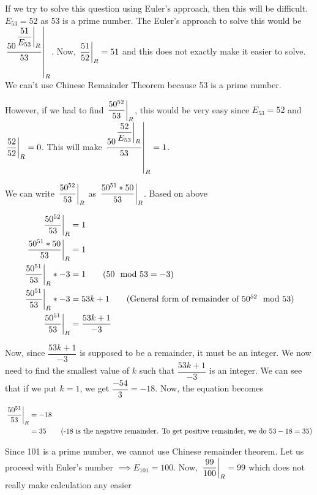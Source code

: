 
If we try to solve this question using Euler's approach, then this will be difficult. $E_{53} = 52 $ as 53 is a prime number. The Euler's approach to solve this would be $\displaystyle{ \left. \frac{50^{ \displaystyle{ \left. \frac{51}{E_{53}} \right |_{R} } }}{53} \right |_{R} }$. Now, $\displaystyle{ \left. \frac{51}{52} \right |_{R} } = 51$ and this does not exactly make it easier to solve. We can't use Chinese Remainder Theorem because 53 is a prime number. \\

\vspace{1cm}

However, if we had to find $\displaystyle{ \left. \frac{50^{52}}{53} \right |_{R} }$, this would be very easy since $E_{53} = 52$ and $\displaystyle{ \left. \frac{52}{52} \right |_{R} } = 0$. This will make $\displaystyle{ \left. \frac{50^{ \displaystyle{ \left. \frac{52}{E_{53}} \right |_{R} } }}{53} \right |_{R} } = 1$. \\

\vspace{1cm}

We can write $\displaystyle{ \left. \frac{50^{52}}{53} \right |_{R} }$ as $\displaystyle{ \left. \frac{50^{51} * 50}{53} \right |_{R} }$. Based on above

\begin{align*}
    \remFrac{50^{52}}{53} &= 1 \\
    \remFrac{50^{51} * 50}{53} &= 1 \\
    \remFrac{50^{51}}{53} * -3 &= 1 \tag{$50 \mod 53 = -3$} \\
    \remFrac{50^{51}}{53} * -3 &= 53k + 1 \tag{General form of remainder of $50^{52} \mod 53$} \\
    \remFrac{50^{51}}{53} &= \dfrac{53k + 1}{-3}
\end{align*}

Now, since $\dfrac{53k + 1}{-3}$ is supposed to be a remainder, it must be an integer. We now need to find the smallest value of $k$ such that $\dfrac{53k + 1}{-3}$ is an integer. We can see that if we put $k=1$, we get $\dfrac{-54}{3} = -18$. Now, the equation becomes

\begin{align*}
    \displaystyle{ \left. \frac{50^{51}}{53} \right |_{R} } &= -18 \\
    &= 35 \tag{-18 is the negative remainder. To get positive remainder, we do $53 - 18 = 35$}
\end{align*}



Since 101 is a prime number, we cannot use Chinese remainder theorem. Let us proceed with Euler's number $\implies E_{101} = 100$. Now, $\displaystyle{ \left. \frac{99}{100} \right |_{R} } = 99$ which does not really make calculation any easier \\

